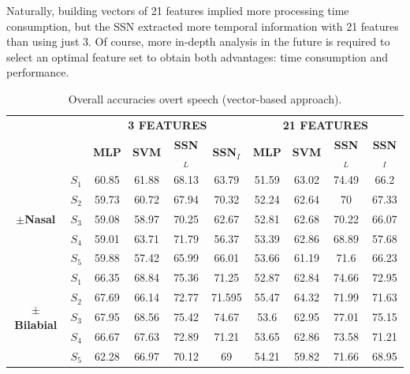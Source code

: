 Naturally, building vectors of 21 features implied more processing time consumption, but the SSN extracted more temporal information with 21 features than using just 3. Of course, more in-depth analysis in the future is required to select an optimal feature set to obtain both advantages: time consumption and performance.\\

\begin{table}[h!]
	\centering
	\caption{Overall accuracies overt speech (vector-based approach).}
	\begin{tabular}{|*{10}{c|}}
		\cline{3-10}
		\multicolumn{2}{c|}{\multirow{2}{*}{}}&\multicolumn{4}{c|}{\textbf{3 FEATURES}}&\multicolumn{4}{c|}{\textbf{21 FEATURES}}\\\cline{3-10}
		\multicolumn{2}{c|}{}&\textbf{MLP}&\textbf{SVM}&\textbf{SSN}$_{L}$&\textbf{SSN}$_{I}$&\textbf{MLP}&\textbf{SVM}&\textbf{SSN}$_{L}$&\textbf{SSN}$_{I}$\\\hline
		\multirow{5}{*}{\begin{sideways}\textbf{\boldmath$\pm$\textbf{Nasal}}\end{sideways}}&\boldmath$S_{1}$&60.85 & 61.88 & 68.13 & 63.79 & 51.59 & 63.02 & 74.49 & 66.2\\\cline{2-10}
		&\boldmath$S_{2}$&59.73 & 60.72 & 67.94 & 70.32 & 52.24 & 62.64 & 70    & 67.33\\\cline{2-10}
		&\boldmath$S_{3}$&59.08 & 58.97 & 70.25 & 62.67 & 52.81 & 62.68 & 70.22 & 66.07\\\cline{2-10}
		&\boldmath$S_{4}$&59.01 & 63.71 & 71.79 & 56.37 & 53.39 & 62.86 & 68.89 & 57.68\\\cline{2-10}
		&\boldmath$S_{5}$&59.88 & 57.42 & 65.99 & 66.01 & 53.66 & 61.19 & 71.6  & 66.23\\\hline
		\multirow{5}{*}{\begin{sideways}\textbf{\boldmath$\pm$\textbf{Bilabial}}\end{sideways}}&\boldmath$S_{1}$&66.35 & 68.84 & \cellcolor{orange}75.36 & 71.25 & 52.87 & 62.84 & \cellcolor{orange}74.66 & 72.95\\\cline{2-10}
		&\boldmath$S_{2}$&67.69 & 66.14 & \cellcolor{orange}72.77 & 71.595 & 55.47 & 64.32 & \cellcolor{orange}71.99 & 71.63\\\cline{2-10}
		&\boldmath$S_{3}$&67.95 & 68.56 & \cellcolor{orange}75.42 & 74.67 & 53.6  & 62.95 & \cellcolor{orange}77.01 & 75.15\\\cline{2-10}
		&\boldmath$S_{4}$&66.67 & 67.63 & \cellcolor{orange}72.89 & 71.21 & 53.65 & 62.86 & \cellcolor{orange}73.58 & 71.21\\\cline{2-10}
		&\boldmath$S_{5}$&62.28 & 66.97 & \cellcolor{orange}70.12 & 69    & 54.21 & 59.82 & \cellcolor{orange}71.66 & 68.95\\\hline
	\end{tabular}%
	\label{Table: Classification_Overt_VB}
\end{table}%


